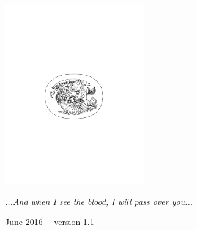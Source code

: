 \documentclass[10pt,oneside,footinclude=true,headinclude=true]{scrbook} %
\begin{document}
\begin{titlepage}
\begin{center}
\large \hfill \vfill

\begingroup
\color{RoyalPurple} \\ \bigskip %
\endgroup

\vfill
\includegraphics[width=6cm]{TFZsuperellipse_bw} \\ \medskip %

\textit{...And when I see the blood, I will pass over you...} \\ \medskip %

June 2016\ -- version 1.1 %

\vfill
\end{center}
\end{titlepage}
    
\newpage
\clearscrheadfoot
\null

\tableofcontents 
\cleardoublepage %
\end{document}

